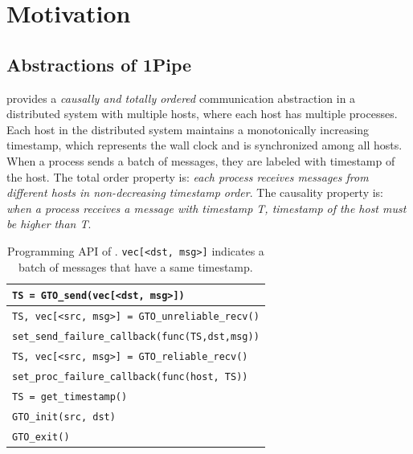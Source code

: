 \section{Motivation}
\label{sec:motivation}

\subsection{Abstractions of 1Pipe}
\label{subsec:abstration}

\sys{} provides a \emph{causally and totally ordered} communication abstraction in a distributed system with multiple hosts, where each host has multiple processes. Each host in the distributed system maintains a monotonically increasing timestamp, which represents the wall clock and is synchronized among all hosts. When a process sends a batch of messages, they are labeled with timestamp of the host. The total order property is: \emph{each process receives messages from different hosts in non-decreasing timestamp order}. The causality property is: \emph{when a process receives a message with timestamp T, timestamp of the host must be higher than T}.

\begin{table}[htbp]
\centering
\begin{tabular}{l}
	\hline
	\texttt{TS = GTO\_send(vec[<dst, msg>])} \\
	\hline
	\hline
	\texttt{TS, vec[<src, msg>] = GTO\_unreliable\_recv()} \\
	\hline
	\texttt{set\_send\_failure\_callback(func(TS,dst,msg))} \\
	\hline
	\hline
	\texttt{TS, vec[<src, msg>] = GTO\_reliable\_recv()} \\
	\hline
	\texttt{set\_proc\_failure\_callback(func(host, TS))} \\
	\hline
	\hline
	\texttt{TS = get\_timestamp()} \\
	\hline
	\texttt{GTO\_init(src, dst)} \\
	\hline
	\texttt{GTO\_exit()} \\
	\hline
\end{tabular}
\caption{Programming API of \sys{}. \texttt{vec[<dst, msg>]} indicates a batch of messages that have a same timestamp.}
\label{tab:abstraction}
\end{table}

